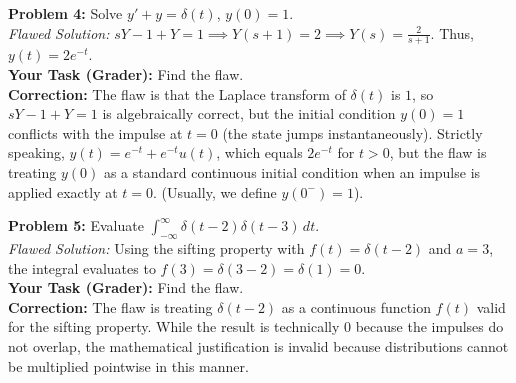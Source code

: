 \documentclass[11pt, letterpaper]{article}
\theoremstyle{definition}
\theoremstyle{remark}
\begin{document}
\vspace{1em}
\textbf{Problem 4:} Solve $y' + y = \delta(t)$, $y(0) = 1$.
\\[4pt]
\textit{Flawed Solution:} $sY - 1 + Y = 1 \implies Y(s+1) = 2 \implies Y(s) = \frac{2}{s+1}$. Thus, $y(t) = 2e^{-t}$.
\\[4pt]
\textbf{Your Task (Grader):} Find the flaw.
\\[4pt]
\textbf{Correction:} The flaw is that the Laplace transform of $\delta(t)$ is $1$, so $sY - 1 + Y = 1$ is algebraically correct, but the initial condition $y(0)=1$ conflicts with the impulse at $t=0$ (the state jumps instantaneously). Strictly speaking, $y(t) = e^{-t} + e^{-t}u(t)$, which equals $2e^{-t}$ for $t>0$, but the flaw is treating $y(0)$ as a standard continuous initial condition when an impulse is applied exactly at $t=0$. (Usually, we define $y(0^-)=1$).

\vspace{1em}
\textbf{Problem 5:} Evaluate $\int_{-\infty}^{\infty} \delta(t - 2) \delta(t - 3) \, dt$.
\\[4pt]
\textit{Flawed Solution:} Using the sifting property with $f(t) = \delta(t-2)$ and $a=3$, the integral evaluates to $f(3) = \delta(3-2) = \delta(1) = 0$.
\\[4pt]
\textbf{Your Task (Grader):} Find the flaw.
\\[4pt]
\textbf{Correction:} The flaw is treating $\delta(t-2)$ as a continuous function $f(t)$ valid for the sifting property. While the result is technically $0$ because the impulses do not overlap, the mathematical justification is invalid because distributions cannot be multiplied pointwise in this manner.
\end{document}
